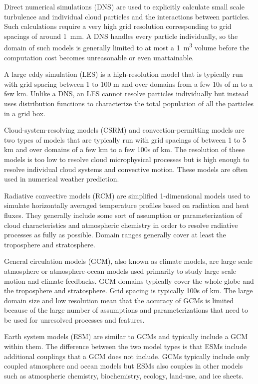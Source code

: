 Direct numerical simulations (DNS) are used to explicitly calculate small scale turbulence and individual cloud particles and the interactions between particles. Such calculations require a very high grid resolution corresponding to grid spacings of around \SI{1}{mm}. A DNS handles every particle individually, so the domain of such models is generally limited to at most a \SI{1}{\cubic\meter} volume before the computation cost becomes unreasonable or even unattainable. \citep{morr2020}

A large eddy simulation (LES) is a high-resolution model that is typically run with grid spacing between 1 to 100 m and over domains from a few 10s of m to a few km. Unlike a DNS, an LES cannot resolve particles individually but instead uses distribution functions to characterize the total population of all the particles in a grid box. \citep{grab2019, morr2020}

Cloud-system-resolving models (CSRM) and convection-permitting models are two types of models that are typically run with grid spacings of between 1 to 5 km and over domains of a few km to a few 100s of km. The resolution of these models is too low to resolve cloud microphysical processes but is high enough to resolve individual cloud systems and convective motion. These models are often used in numerical weather prediction. \citep{grab2019}

Radiative convective models (RCM) are simplified 1-dimensional models used to simulate horizontally averaged temperature profiles based on radiation and heat fluxes. They generally include some sort of assumption or parameterization of cloud characteristics and atmospheric chemistry in order to resolve radiative processes as fully as possible. Domain ranges generally cover at least the troposphere and stratosphere. \citep{rama1978,zhan2015}

General circulation models (GCM), also known as climate models, are large scale atmosphere or atmosphere-ocean models used primarily to study large scale motion and climate feedbacks. GCM domains typically cover the whole globe and the troposphere and stratosphere. Grid spacing is typically 100s of km. The large domain size and low resolution mean that the accuracy of GCMs is limited because of the large number of assumptions and parameterizations that need to be used for unresolved processes and features. \citep{wata2008,zhan2015}

Earth system models (ESM) are similar to GCMs and typically include a GCM within them. The difference between the two model types is that ESMs include additional couplings that a GCM does not include. GCMs typically include only coupled atmosphere and ocean models but ESMs also couples in other models such as atmospheric chemistry, biochemistry, ecology, land-use, and ice sheets. \citep{wata2008, zhan2015}

